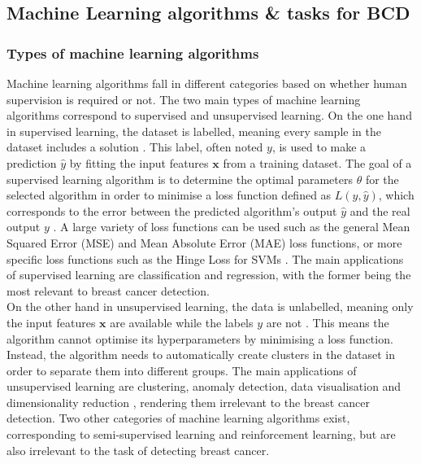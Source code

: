 \subsection{Machine Learning algorithms \& tasks for BCD}

\subsubsection{Types of machine learning algorithms}

Machine learning algorithms fall in different categories based on whether human supervision is required or not. The two main types of machine learning algorithms correspond to supervised and unsupervised learning. On the one hand in supervised learning, the dataset is labelled, meaning every sample in the dataset includes a solution \cite{Geron2019}. This label, often noted $y$, is used to make a prediction $\hat{y}$ by fitting the input features $\textbf{x}$ from a training dataset. The goal of a supervised learning algorithm is to determine the optimal parameters $\theta$ for the selected algorithm in order to minimise a loss function defined as $L(y,\hat{y})$, which corresponds to the error between the predicted algorithm's output $\hat{y}$ and the real output $y$ \cite{Litjens2017}. A large variety of loss functions can be used such as the general Mean Squared Error (MSE) and Mean Absolute Error (MAE) loss functions, or more specific loss functions such as the Hinge Loss for SVMs \cite{Geron2019}. The main applications of supervised learning are classification and regression, with the former being the most relevant to breast cancer detection.\\

On the other hand in unsupervised learning, the data is unlabelled, meaning only the input features $\textbf{x}$ are available while the labels $y$ are not \cite{Litjens2017}. This means the algorithm cannot optimise its hyperparameters by minimising a loss function. Instead, the algorithm needs to automatically create clusters in the dataset in order to separate them into different groups. The main applications of unsupervised learning are clustering, anomaly detection, data visualisation and dimensionality reduction \cite{Geron2019}, rendering them irrelevant to the breast cancer detection. Two other categories of machine learning algorithms exist, corresponding to semi-supervised learning and reinforcement learning, but are also irrelevant to the task of detecting breast cancer.\\

